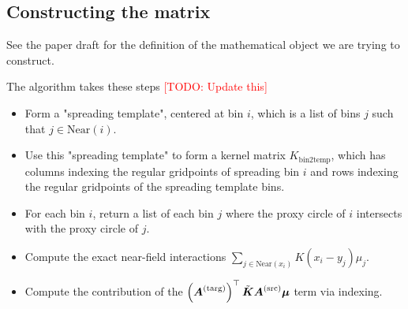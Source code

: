 \documentclass[11pt]{article}
\newcommand{\todo}[1]{{\textcolor{red}{[TODO: #1]}}}
\begin{document}
\subsection{Constructing the matrix}

See the paper draft for the definition of the mathematical object we are trying to construct. 

The algorithm takes these steps \todo{Update this}
\begin{itemize}
  \item Form a "spreading template", centered at bin $i$, which is a list of bins $j$ such that $j \in \text{Near}(i)$. 
  \item Use this "spreading template" to form a kernel matrix $K_{\text{bin2temp}}$, which has columns indexing the regular gridpoints of spreading bin $i$ and rows indexing the regular gridpoints of the spreading template bins.
  \item For each bin $i$, return a list of each bin $j$ where the proxy circle of $i$ intersects with the proxy circle of $j$.
  \item Compute the exact near-field interactions $\sum_{j \in \text{Near}(x_i)} K(x_i - y_j) \mu_j$.
  \item Compute the contribution of the $\left( \boldsymbol{A}^{(\text{targ})}\right)^\top \tilde{\boldsymbol{K}} \boldsymbol{A}^{(\text{src})} \boldsymbol{\mu}$ term via indexing.
\end{itemize}
\end{document}
